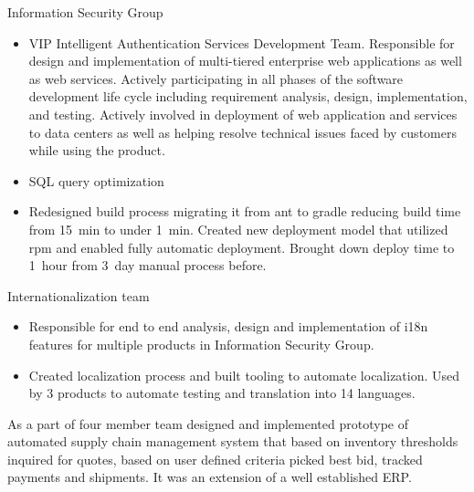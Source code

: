 \documentclass[11pt,a4paper,roman]{moderncv}       %
\begin{document}
\vspace{6pt}

Information Security Group

\begin{itemize}
    \item VIP Intelligent Authentication Services Development Team. Responsible for design and implementation of multi-tiered enterprise web applications as well as web services. Actively participating in all phases of the software development life cycle including requirement analysis, design, implementation, and testing. Actively involved in deployment of web application and services to data centers as well as helping resolve technical issues faced by customers while using the product.
    \item SQL query optimization
    \item Redesigned build process migrating it from ant to gradle reducing build time from 15~min to under 1~min. Created new deployment model that utilized rpm and enabled fully automatic deployment. Brought down deploy time to 1~hour from 3~day manual process before.
\end{itemize}

\vspace{6pt}

Internationalization team

\begin{itemize}
    \item Responsible for end to end analysis, design and implementation of i18n features for multiple products in Information Security Group.
    \item Created localization process and built tooling to automate localization. Used by 3 products to automate testing and translation into 14 languages.
\end{itemize}

\vspace{16pt}


As a part of four member team designed and implemented prototype of automated supply chain management system that based on inventory thresholds inquired for quotes, based on user defined criteria picked best bid, tracked payments and shipments. It was an extension of a well established ERP.

\vspace{16pt}
\end{document}
